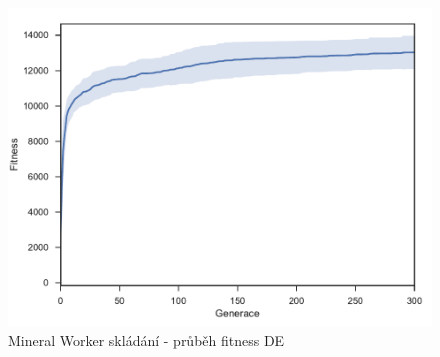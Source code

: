 \begin{figure}[t]\centering
	\includegraphics[width=\columnwidth]{../img/MineralMap/MineralWorkerPickup}
	\caption{Mineral Worker skládání -  průběh fitness DE}
	\label{obr04:MineralWorkerStore}
\end{figure}
\clearpage

